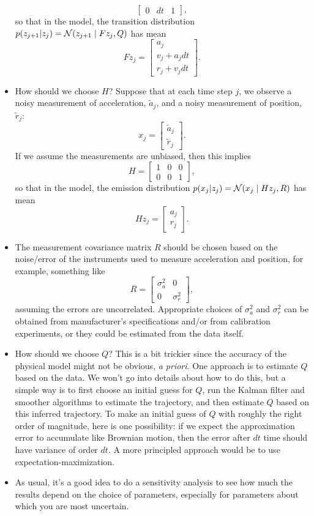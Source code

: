 \documentclass[12pt]{article}
\begin{document}
\begin{itemize}
$$\begin{bmatrix}
                      0 & dt & 1 \end{bmatrix},$$
so that in the model, the transition distribution $p(z_{j+1} | z_j) = \mathcal{N}(z_{j+1} \mid F z_j,Q)$ has mean
$$ F z_j = \begin{bmatrix}a_j\\v_j + a_j dt\\r_j + v_j dt \end{bmatrix} .$$
\item How should we choose $H$? Suppose that at each time step $j$, we observe a noisy measurement of acceleration, $\tilde a_j$, and a noisy measurement of position, $\tilde r_j$:
$$ x_j = \begin{bmatrix}\tilde a_j\\\tilde r_j \end{bmatrix} .$$
If we assume the measurements are unbiased, then this implies
$$ H = \begin{bmatrix} 1 & 0 & 0\\
                       0 & 0 & 1 \end{bmatrix}, $$
so that in the model, the emission distribution $p(x_j | z_j) = \mathcal{N}(x_j \mid H z_j,R)$ has mean
$$ H z_j = \begin{bmatrix}a_j\\r_j\end{bmatrix} .$$
\item The measurement covariance matrix $R$ should be chosen based on the noise/error of the instruments used to measure acceleration and position, for example, something like
$$ R = \begin{bmatrix} \sigma_a^2 & 0 \\
                       0 & \sigma_r^2 \end{bmatrix}, $$
assuming the errors are uncorrelated. Appropriate choices of $\sigma_a^2$ and $\sigma_r^2$ can be obtained from manufacturer's specifications and/or from calibration experiments, or they could be estimated from the data itself.
\item How should we choose $Q$? This is a bit trickier since the accuracy of the physical model might not be obvious, \textit{a priori}. One approach is to estimate $Q$ based on the data. We won't go into details about how to do this, but a simple way is to first choose an initial guess for $Q$, run the Kalman filter and smoother algorithms to estimate the trajectory, and then estimate $Q$ based on this inferred trajectory. To make an initial guess of $Q$ with roughly the right order of magnitude, here is one possibility: if we expect the approximation error to accumulate like Brownian motion, then the error after $dt$ time should have variance of order $dt$. A more principled approach would be to use expectation-maximization.
\item As usual, it's a good idea to do a sensitivity analysis to see how much the results depend on the choice of parameters, especially for parameters about which you are most uncertain.
\end{itemize}
\end{document}
